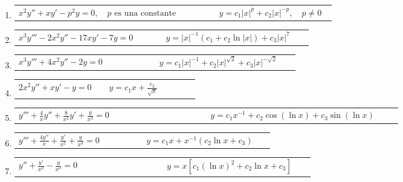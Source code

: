 \documentclass[a4paper,12pt]{article}
\begin{document}
\begin{enumerate}
    \item
    \begin{tabularx}{\linewidth}{L{0.60\linewidth} R{0.35\linewidth}}
    \( x^2 y'' + x y' - p^2 y = 0, \quad p \text{ es una constante} \) & \(\displaystyle y = c_1 |x|^p + c_2 |x|^{-p}, \quad p \neq 0 \)
    \end{tabularx}

    \item
    \begin{tabularx}{\linewidth}{L{0.45\linewidth} R{0.45\linewidth}}
    \( x^3 y''' - 2 x^2 y'' - 17 x y' - 7 y = 0 \) & \(\displaystyle y = |x|^{-1} \left( c_1 + c_2 \ln |x| \right) + c_3 |x|^{7} \)
    \end{tabularx}

    \item
    \begin{tabularx}{\linewidth}{L{0.45\linewidth} R{0.45\linewidth}}
    \( x^3 y''' + 4 x^2 y'' - 2 y = 0 \) & \(\displaystyle y = c_1 |x|^{-1} + c_2 |x|^{\sqrt{2}} + c_3 |x|^{-\sqrt{2}} \)
    \end{tabularx}

    \item
    \begin{tabularx}{\linewidth}{L{0.45\linewidth} R{0.45\linewidth}}
    \( 2 x^2 y'' + x y' - y = 0 \) & \(\displaystyle y = c_1 x + \frac{c_2}{\sqrt{x}} \)
    \end{tabularx}

    \item
    \begin{tabularx}{\linewidth}{L{0.45\linewidth} R{0.45\linewidth}}
    \( y''' + \frac{4}{x} y'' + \frac{8}{x^2} y' + \frac{y}{x^3} = 0 \) & \(\displaystyle y = c_1 x^{-1} + c_2 \cos(\ln x) + c_3 \sin(\ln x) \)
    \end{tabularx}

    \item
    \begin{tabularx}{\linewidth}{L{0.45\linewidth} R{0.45\linewidth}}
    \( y''' + \frac{4 y''}{x} + \frac{y'}{x^2} + \frac{y}{x^3} = 0 \) & \(\displaystyle y = c_1 x + x^{-1} \left( c_2 \ln x + c_3 \right) \)
    \end{tabularx}

    \item
    \begin{tabularx}{\linewidth}{L{0.45\linewidth} R{0.45\linewidth}}
    \( y'' + \frac{y'}{x^2} - \frac{y}{x^3} = 0 \) & \(\displaystyle y = x \left[ c_1 (\ln x)^2 + c_2 \ln x + c_3 \right] \)
    \end{tabularx}


\end{enumerate}
\end{document}
